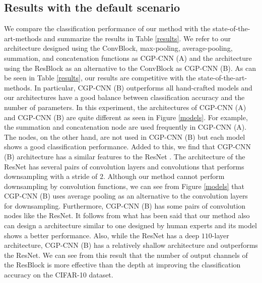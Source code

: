 


\subsection{Results with the default scenario}
We compare the classification performance of our method with the state-of-the-art-methods and summarize the results in Table \ref{results}.
We refer to our architecture designed using the ConvBlock, max-pooling, average-pooling, summation, and concatenation functions as CGP-CNN (A) and the architecture using the ResBlock as an alternative to the ConvBlock as CGP-CNN (B).
As can be seen in Table \ref{results}, our results are competitive with the state-of-the-art-methods.
In particular, CGP-CNN (B) outperforms all hand-crafted models and our architectures have a good balance between classification accuracy and the number of parameters.
In this experiment, the architectures of CGP-CNN (A) and CGP-CNN (B) are quite different as seen in Figure \ref{models}.
For example, the summation and concatenation node are used frequently in CGP-CNN (A).
The nodes, on the other hand, are not used in CGP-CNN (B) but each model shows a good classification performance.
Added to this, we find that CGP-CNN (B) architecture has a similar features to the ResNet \cite{he_deep_2016}.
The architecture of the ResNet \cite{he_deep_2016} has several pairs of convolution layers and convolutions that performs downsampling with a stride of $2$.
Although our method cannot perform downsampling by convolution functions, we can see from Figure \ref{models} that CGP-CNN (B) uses average pooling as an alternative to the convolution layers for downsampling.
Furthermore, CGP-CNN (B) has some pairs of convolution nodes like the ResNet.
It follows from what has been said that our method also can design a architecture similar to one designed by human experts and its model shows a better performance.
Also, while the ResNet has a deep $110$-layer architecture, CGP-CNN (B) has a relatively shallow architecture and outperforms the ResNet.
We can see from this result that the number of output channels of the ResBlock is more effective than the depth at improving the classification accuracy on the CIFAR-10 dataset.

